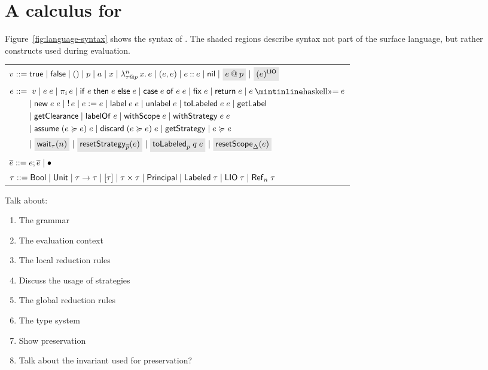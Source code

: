 \documentclass[conference]{IEEEtran}
\begin{document}
\section{A calculus for \lang}\label{lab:calculus}
Figure~\ref{fig:language-syntax} shows the syntax of \lang. The shaded regions describe syntax not part of the surface language, but rather constructs used during evaluation.

\begin{figure*}
    \centering
    \begin{tabular}{l}
         $\val ::= \true \mid \false \mid () \mid p \mid \addr \mid x \mid \abs{n}{\lb{p}{\type}}{x}{\expr} \mid (\expr, \expr) \mid \cons{\expr}{\expr} \mid \nil \mid \graybox{\lb{p}{\expr}} \mid \graybox{\lio{\expr}}$ \\
         $\begin{aligned}[t]
         \expr ::=&\;\; \val \mid \app{\expr}{\expr} \mid \proj{i}{\expr} \mid \ifexpr{\expr}{\expr}{\expr} \mid \case{\expr}{\expr}{\expr} \mid \fix{\expr} \mid \return{\expr} \mid \bind{\expr}{\expr} \\ &\mid
         \new{\expr}{\expr} \mid \readref{\expr} \mid \writeref{\expr}{\expr} \mid \Label{\expr}{\expr} \mid \unlabel{\expr} \mid
         \tolabeled{\expr}{\expr} \mid \getlabel \\ &\mid \getclearance \mid \labelof{\expr} \mid \withscope{\expr} \mid \withstrategy{\expr}{\expr} \\ &\mid \adddelegate{\expr}{\expr}{\expr} \mid \removedelegate{\expr}{\expr}{\expr} \mid \getstrategy \mid \expr \actsfor \expr \\ &\mid
         \graybox{\wait{n}[\type]} \mid \graybox{\resetstrategy{\overline{p}}{\expr}} \mid \graybox{\resetTolabeled{p}{q}{\expr}} \mid \graybox{\resetscope{\scope}{\expr}}
         \end{aligned}$ \\
         $\overline{e} ::= e; \overline{e} \mid \bullet$ \\
         $\type ::= \bool \mid \unit \mid \func{\type}{\type} \mid \listtype{\type} \mid \pair{\type}{\type} \mid \labeltype \mid \labeled{\type} \mid \liotype{\type} \mid \reftype[n]{\type}$ \\
    \end{tabular}
    \caption{The \lang{} language}
    \label{fig:language-syntax}
\end{figure*}

Talk about:
\begin{enumerate}
    \item The grammar
    \item The evaluation context
    \item The local reduction rules
    \item Discuss the usage of strategies
    \item The global reduction rules
    \item The type system
    \item Show preservation
    \item Talk about the invariant used for preservation?
\end{enumerate}
\end{document}

